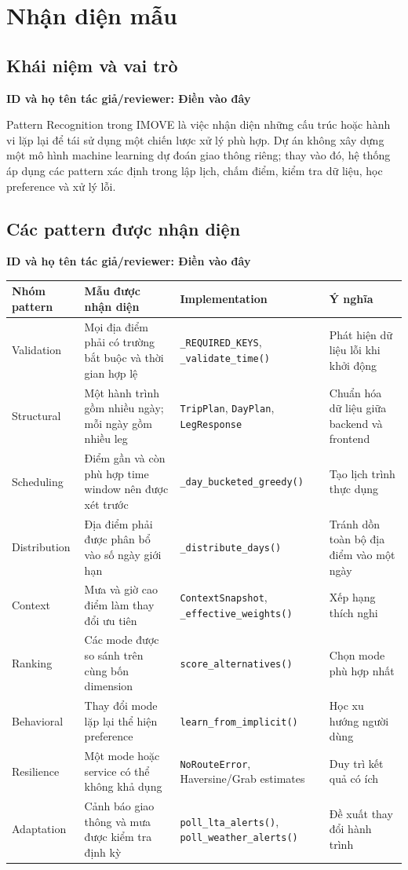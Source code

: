 \documentclass[12pt,a4paper]{article}
\newcommand{\tacgia}{%
  \begin{tcolorbox}[colback=blue!3,colframe=blue!25,boxrule=0.4pt,arc=1mm]
    \small\textbf{ID và họ tên tác giả/reviewer: Điền vào đây}
  \end{tcolorbox}
}
\begin{document}
\section{Nhận diện mẫu}

\subsection{Khái niệm và vai trò}
\tacgia

Pattern Recognition trong IMOVE là việc nhận diện những cấu trúc hoặc hành vi lặp lại để tái sử dụng một chiến lược xử lý phù hợp. Dự án không xây dựng một mô hình machine learning dự đoán giao thông riêng; thay vào đó, hệ thống áp dụng các pattern xác định trong lập lịch, chấm điểm, kiểm tra dữ liệu, học preference và xử lý lỗi.

\subsection{Các pattern được nhận diện}
\tacgia

\begin{longtable}{|L{2.6cm}|L{4.0cm}|L{4.0cm}|L{4.2cm}|}
\hline
\textbf{Nhóm pattern} & \textbf{Mẫu được nhận diện} & \textbf{Implementation} & \textbf{Ý nghĩa} \\ \hline
\endhead
Validation & Mọi địa điểm phải có trường bắt buộc và thời gian hợp lệ & \texttt{\_REQUIRED\_KEYS}, \texttt{\_validate\_time()} & Phát hiện dữ liệu lỗi khi khởi động \\ \hline
Structural & Một hành trình gồm nhiều ngày; mỗi ngày gồm nhiều leg & \texttt{TripPlan}, \texttt{DayPlan}, \texttt{LegResponse} & Chuẩn hóa dữ liệu giữa backend và frontend \\ \hline
Scheduling & Điểm gần và còn phù hợp time window nên được xét trước & \texttt{\_day\_bucketed\_greedy()} & Tạo lịch trình thực dụng \\ \hline
Distribution & Địa điểm phải được phân bổ vào số ngày giới hạn & \texttt{\_distribute\_days()} & Tránh dồn toàn bộ địa điểm vào một ngày \\ \hline
Context & Mưa và giờ cao điểm làm thay đổi ưu tiên & \texttt{ContextSnapshot}, \texttt{\_effective\_weights()} & Xếp hạng thích nghi \\ \hline
Ranking & Các mode được so sánh trên cùng bốn dimension & \texttt{score\_alternatives()} & Chọn mode phù hợp nhất \\ \hline
Behavioral & Thay đổi mode lặp lại thể hiện preference & \texttt{learn\_from\_implicit()} & Học xu hướng người dùng \\ \hline
Resilience & Một mode hoặc service có thể không khả dụng & \texttt{NoRouteError}, Haversine/Grab estimates & Duy trì kết quả có ích \\ \hline
Adaptation & Cảnh báo giao thông và mưa được kiểm tra định kỳ & \texttt{poll\_lta\_alerts()}, \texttt{poll\_weather\_alerts()} & Đề xuất thay đổi hành trình \\ \hline
\end{longtable}
\end{document}
